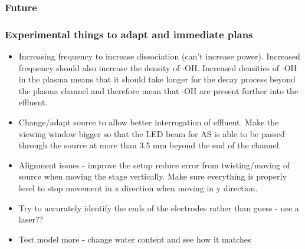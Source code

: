 \documentclass[11pt, oneside]{article}   	%
\begin{document}
\subsubsection{Future}

\subsubsection{Experimental things to adapt and immediate plans}
\begin{itemize}
\item Increasing frequency to increase dissociation (can't increase power). Increased frequency should also increase the density of $\cdot$OH. Increased densities of $\cdot$OH in the plasma means that it should take longer for the decay process beyond the plasma channel and therefore mean that $\cdot$OH are present further into the effluent.
\item Change/adapt source to allow better interrogation of effluent. Make the viewing window bigger so that the LED beam for AS is able to be passed through the source at more than 3.5 mm beyond the end of the channel.
\item Alignment issues - improve the setup reduce error from twisting/moving of source when moving the stage vertically. Make sure everything is properly level to stop movement in x direction when moving in y direction.
\item Try to accurately identify the ends of the electrodes rather than guess - use a laser??
\item Test model more - change water content and see how it matches
\end{itemize}





\end{document}
